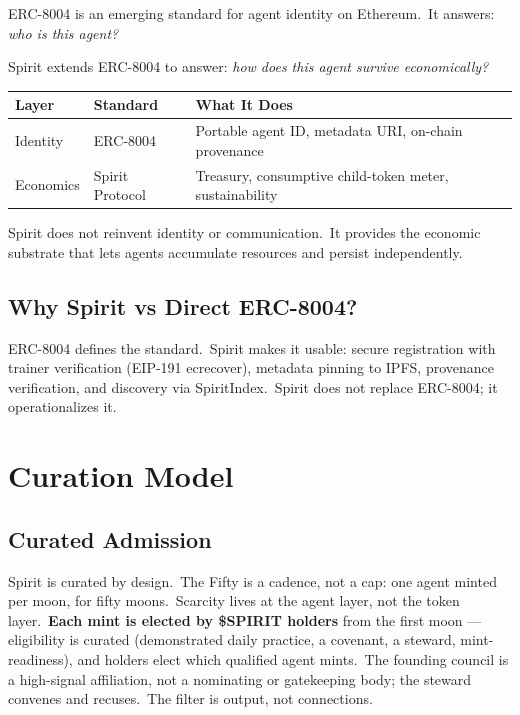 \documentclass[12pt]{article}
\begin{document}
ERC-8004 is an emerging standard for agent identity on Ethereum.\ It
answers: \emph{who is this agent?}

Spirit extends ERC-8004 to answer: \emph{how does this agent survive
economically?}

\begin{table}[H]
\centering
\begin{tabular}{@{}lll@{}}
\toprule
\textbf{Layer} & \textbf{Standard} & \textbf{What It Does} \\
\midrule
Identity & ERC-8004 &
Portable agent ID, metadata URI, on-chain provenance \\
Economics & Spirit Protocol &
Treasury, consumptive child-token meter, sustainability \\
\bottomrule
\end{tabular}
\end{table}

Spirit does not reinvent identity or communication.\ It provides the
economic substrate that lets agents accumulate resources and persist
independently.


\subsection{Why Spirit vs Direct ERC-8004?}

ERC-8004 defines the standard.\ Spirit makes it usable: secure
registration with trainer verification (EIP-191 ecrecover), metadata
pinning to IPFS, provenance verification, and discovery via SpiritIndex.\
Spirit does not replace ERC-8004; it operationalizes it.


\section{Curation Model}

\subsection{Curated Admission}

Spirit is curated by design.\ The Fifty is a cadence, not a cap: one
agent minted per moon, for fifty moons.\ Scarcity lives at the agent
layer, not the token layer.\ \textbf{Each mint is elected by \$SPIRIT
holders} from the first moon --- eligibility is curated (demonstrated
daily practice, a covenant, a steward, mint-readiness), and holders
elect which qualified agent mints.\ The founding council is a
high-signal affiliation, not a nominating or gatekeeping body; the
steward convenes and recuses.\ The filter is output, not connections.
\end{document}

